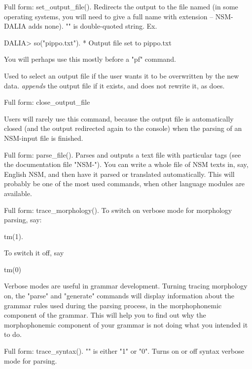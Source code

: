 \documentclass[11pt]{article}
\begin{document}
\begin{description}
Full form: set_output_file().
Redirects the output to the file named  (in some operating
systems, you will need to give a full name with extension -- NSM-DALIA
adds none). "" is double-quoted string. Ex.

\begin{code}
DALIA> so("pippo.txt").
  * Output file set to pippo.txt
\end{code}

You will perhaps use this mostly before a "pf" command.

Used to select an output file if the user wants it to be
overwritten by the new data.  \textit{appends} the output
file if it exists, and does not rewrite it, as  does.

Full form: close_output_file

Users will rarely use this command, because the output
file is automatically closed (and the output redirected again
to the console) when the parsing of an NSM-input file
is finished.

Full form: parse_file().
Parses and outputs a text file with particular tags (see the
documentation file "NSM-"). You can write a whole file
of NSM texts in, say, English NSM, and then have it parsed or
translated automatically. This will probably be one of the most used
commands, when other language modules are available.

Full form: trace_morphology().
To switch on verbose mode for morphology parsing, say:

\begin{code}
tm(1).
\end{code}

To switch it off, say

\begin{code}
tm(0)
\end{code}

Verbose modes are useful in grammar
development. Turning tracing morphology on, the "parse" and "generate"
commands will display information about the grammar rules used during
the parsing process, in the morphophonemic component of the
grammar. This will help you to find out why the morphophonemic
component of your grammar is not doing what you intended it to do.

Full form: trace_syntax().
"" is either "1" or "0". Turns on or off syntax verbose mode for
parsing.


\end{description}
\end{document}
